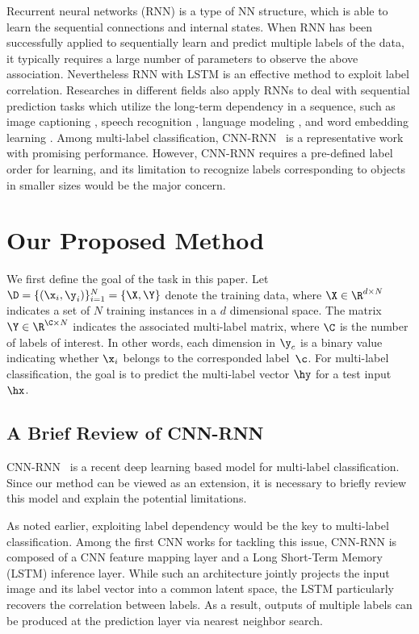 \documentclass[letterpaper]{article} %
\begin{document}
Recurrent neural networks (RNN) is a type of NN structure, which is able to learn the sequential connections and internal states. When RNN has been successfully applied to sequentially learn and predict multiple labels of the data, it typically requires a large number of parameters to observe the above association. Nevertheless RNN with LSTM \cite{hochreiter1997long} is an effective method to exploit label correlation. Researches in different fields also apply RNNs to deal with sequential prediction tasks which utilize the long-term dependency in a sequence, such as image captioning \cite{mao2014deep}, speech recognition \cite{graves2013speech}, language modeling \cite{sundermeyer2012lstm}, and word embedding learning \cite{le2015compositional}. Among multi-label classification, CNN-RNN~\cite{wang2016cnn} is a representative work with promising performance. However, CNN-RNN requires a pre-defined label order for learning, and its limitation to recognize labels corresponding to objects in smaller sizes would be the major concern.


\section{Our Proposed Method}
We first define the goal of the task in this paper. Let $\D=\{(\x_i,\y_i)\}_{i=1}^N = \{\X,\Y\}$ denote the training data, where $\X \in \R^{d\times N}$ indicates a set of $N$ training instances in a $d$ dimensional space. The matrix $\Y \in \R^{\C\times N}$ indicates the associated multi-label matrix, where $\C$ is the number of labels of interest. In other words, each dimension in $\y_c$ is a binary value indicating whether $\x_i$ belongs to the corresponded label~$\c$. For multi-label classification, the goal is to predict the multi-label vector $\hy$ for a test input $\hx$.

\subsection{A Brief Review of CNN-RNN}

CNN-RNN~\cite{wang2016cnn} is a recent deep learning based model for multi-label classification. Since our method can be viewed as an extension, it is necessary to briefly review this model and explain the potential limitations.

As noted earlier, exploiting label dependency would be the key to multi-label classification. Among the first CNN works for tackling this issue, CNN-RNN is composed of a CNN feature mapping layer and a Long Short-Term Memory (LSTM) inference layer. While such an architecture jointly projects the input image and its label vector into a common latent space, the LSTM particularly recovers the correlation between labels. As a result, outputs of multiple labels can be produced at the prediction layer via nearest neighbor search.
\end{document}
